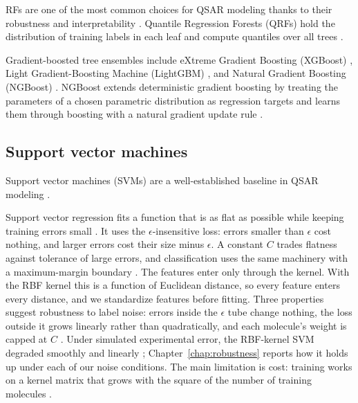 RFs are one of the most common choices for QSAR modeling thanks to their robustness and interpretability \citep{Svetnik2003}. Quantile Regression Forests (QRFs) hold the distribution of training labels in each leaf and compute quantiles over all trees \citep{Meinshausen2006}.

Gradient-boosted tree ensembles include eXtreme Gradient Boosting (XGBoost) \citep{Mustapha2016, Tian2022}, Light Gradient-Boosting Machine (LightGBM) \citep{ke2017lightgbm}, and Natural Gradient Boosting (NGBoost) \citep{Duan2020}. NGBoost extends deterministic gradient boosting by treating the parameters of a chosen parametric distribution as regression targets and learns them through boosting with a natural gradient update rule \citep{Duan2020}.


\subsection{Support vector machines}

Support vector machines (SVMs) are a well-established baseline in QSAR modeling \citep{Vapnik1995, Svetnik2003}.

Support vector regression fits a function that is as flat as possible while keeping training errors small \citep{Vapnik1995, Smola2004}. It uses the $\epsilon$-insensitive loss: errors smaller than $\epsilon$ cost nothing, and larger errors cost their size minus $\epsilon$. A constant $C$ trades flatness against tolerance of large errors, and classification uses the same machinery with a maximum-margin boundary \citep{Cortes1995}. The features enter only through the kernel. With the RBF kernel this is a function of Euclidean distance, so every feature enters every distance, and we standardize features before fitting. Three properties suggest robustness to label noise: errors inside the $\epsilon$ tube change nothing, the loss outside it grows linearly rather than quadratically, and each molecule's weight is capped at $C$ \citep{Smola2004}. Under simulated experimental error, the RBF-kernel SVM degraded smoothly and linearly \citep{Cortes2015}; Chapter~\ref{chap:robustness} reports how it holds up under each of our noise conditions. The main limitation is cost: training works on a kernel matrix that grows with the square of the number of training molecules \citep{Chang2011}.


